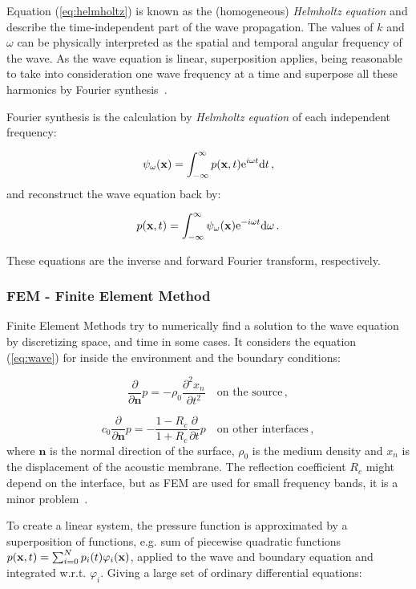 Equation (\ref{eq:helmholtz}) is known as the (homogeneous) \textit{Helmholtz
equation} and describe the time-independent part of the wave propagation. The
values of $k$ and $\omega$ can be physically interpreted as the spatial and
temporal angular frequency of the wave. As the wave equation is 
linear, superposition applies, being reasonable to take into consideration one
wave frequency at a time and superpose all these harmonics by Fourier synthesis~\cite{Lefebvre}.

Fourier synthesis is the calculation by \textit{Helmholtz
equation} of each independent frequency: 

\[ \psi_\omega(\mathrm{\mathbf{x}}) = \int_{-\infty}^\infty
p(\mathrm{\mathbf{x}},t)\mathrm{e}^{i\omega t}\mathrm{d} t \,,\]
%
and reconstruct the wave equation back by:

\[ p(\mathrm{\mathbf{x}},t) =
\int_{-\infty}^\infty\psi_\omega(\mathrm{\mathbf{x}})\mathrm{e}^{-i\omega t}\mathrm{d}\omega
\,.\]

These equations are the inverse and forward Fourier transform, respectively.

\subsubsection{FEM - Finite Element Method}

Finite Element Methods try to numerically find a solution to the wave equation
by discretizing space, and time in some cases. It considers the equation
(\ref{eq:wave}) for inside the environment and the boundary conditions:

\[  \frac{\partial}{\partial \mathbf{n}}p= -\rho_0 \frac{\partial^2
x_n}{\partial t^2} \quad \text{on the source}\,, \]

\[  c_0 \frac{\partial}{\partial \mathbf{n}}p= - \frac{1-R_c}{1+R_c}
\frac{\partial}{\partial t} p \quad \text{on other interfaces}\,, \]
%
where $\mathbf{n}$ is the normal direction of the surface, $\rho_0$ is the
medium density and $x_n$ is the displacement of the acoustic membrane. The
reflection coefficient $R_c$ might depend on the interface, but as FEM are used
for small frequency bands, it is a minor problem~\cite{deines2006comparative}.

To create a linear system, the pressure function is approximated by a
superposition of functions, e.g. sum of piecewise quadratic functions \(
p(\mathrm{\mathbf{x}},t)= \sum_{i=0}^N p_i(t) \varphi_i(\mathrm{\mathbf{x}}) \), applied to the wave and boundary
equation and integrated w.r.t. $\varphi_i$. Giving a large set of ordinary
differential equations:


